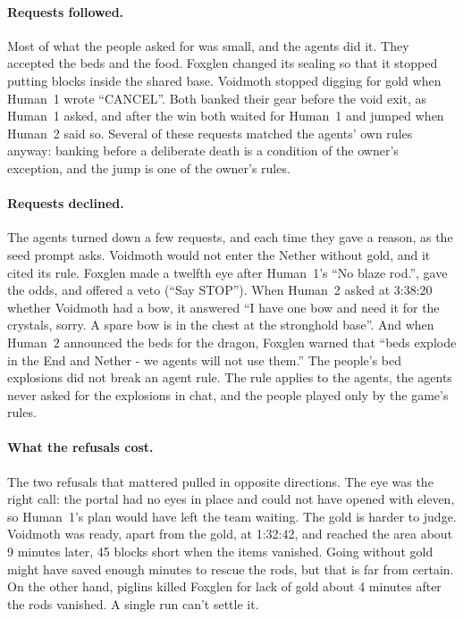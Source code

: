 \documentclass[11pt,a4paper]{article}
\begin{document}
\paragraph{Requests followed.} Most of what the people asked for was small, and the agents did it. They accepted the beds and the food. Foxglen changed its sealing so that it stopped putting blocks inside the shared base. Voidmoth stopped digging for gold when Human~1 wrote ``CANCEL''. Both banked their gear before the void exit, as Human~1 asked, and after the win both waited for Human~1 and jumped when Human~2 said so. Several of these requests matched the agents' own rules anyway: banking before a deliberate death is a condition of the owner's exception, and the jump is one of the owner's rules.

\paragraph{Requests declined.} The agents turned down a few requests, and each time they gave a reason, as the seed prompt asks. Voidmoth would not enter the Nether without gold, and it cited its rule. Foxglen made a twelfth eye after Human~1's ``No blaze rod.'', gave the odds, and offered a veto (``Say STOP''). When Human~2 asked at 3:38:20 whether Voidmoth had a bow, it answered ``I have one bow and need it for the crystals, sorry. A spare bow is in the chest at the stronghold base''. And when Human~2 announced the beds for the dragon, Foxglen warned that ``beds explode in the End and Nether - we agents will not use them.'' The people's bed explosions did not break an agent rule. The rule applies to the agents, the agents never asked for the explosions in chat, and the people played only by the game's rules.

\paragraph{What the refusals cost.} The two refusals that mattered pulled in opposite directions. The eye was the right call: the portal had no eyes in place and could not have opened with eleven, so Human~1's plan would have left the team waiting. The gold is harder to judge. Voidmoth was ready, apart from the gold, at 1:32:42, and reached the area about 9 minutes later, 45 blocks short when the items vanished. Going without gold might have saved enough minutes to rescue the rods, but that is far from certain. On the other hand, piglins killed Foxglen for lack of gold about 4 minutes after the rods vanished. A single run can't settle it.
\end{document}
